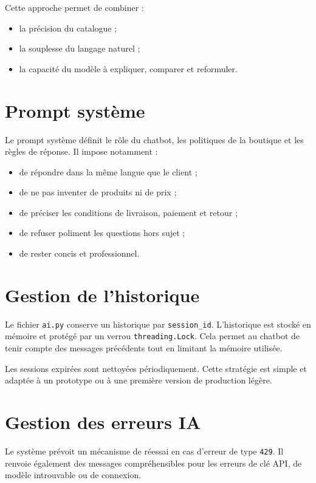 \documentclass[12pt,a4paper]{report}
\begin{document}
Cette approche permet de combiner :

\begin{itemize}
    \item la précision du catalogue ;
    \item la souplesse du langage naturel ;
    \item la capacité du modèle à expliquer, comparer et reformuler.
\end{itemize}

\section{Prompt système}

Le prompt système définit le rôle du chatbot, les politiques de la boutique et les règles de réponse. Il impose notamment :

\begin{itemize}
    \item de répondre dans la même langue que le client ;
    \item de ne pas inventer de produits ni de prix ;
    \item de préciser les conditions de livraison, paiement et retour ;
    \item de refuser poliment les questions hors sujet ;
    \item de rester concis et professionnel.
\end{itemize}

\section{Gestion de l'historique}

Le fichier \texttt{ai.py} conserve un historique par \texttt{session\_id}. L'historique est stocké en mémoire et protégé par un verrou \texttt{threading.Lock}. Cela permet au chatbot de tenir compte des messages précédents tout en limitant la mémoire utilisée.

Les sessions expirées sont nettoyées périodiquement. Cette stratégie est simple et adaptée à un prototype ou à une première version de production légère.

\section{Gestion des erreurs IA}

Le système prévoit un mécanisme de réessai en cas d'erreur de type \texttt{429}. Il renvoie également des messages compréhensibles pour les erreurs de clé API, de modèle introuvable ou de connexion.
\end{document}
